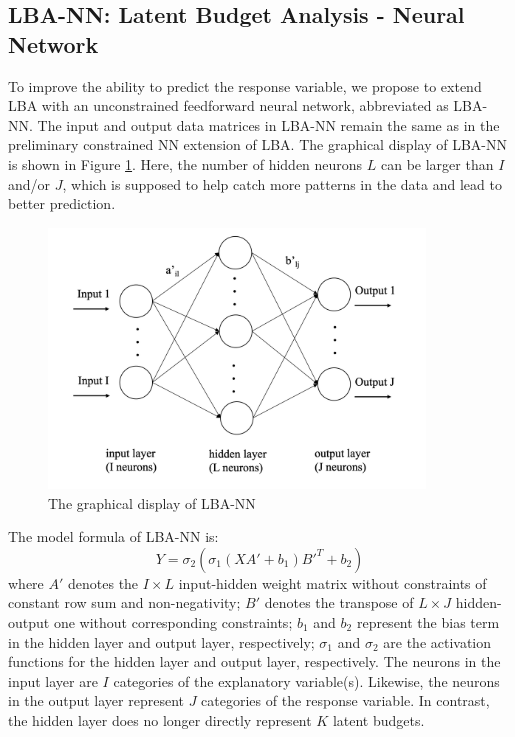 \documentclass[]{interact}
\theoremstyle{plain}%
\theoremstyle{definition}
\theoremstyle{remark}
\begin{document}
\hypertarget{subsection:lbann}{%
\subsection{LBA-NN: Latent Budget Analysis - Neural
Network}\label{subsection:lbann}}

To improve the ability to predict the response variable, we propose to
extend LBA with an unconstrained feedforward neural network, abbreviated
as LBA-NN. The input and output data matrices in LBA-NN remain the same
as in the preliminary constrained NN extension of LBA. The graphical
display of LBA-NN is shown in Figure \ref{fig:2}. Here, the number of
hidden neurons \(L\) can be larger than \(I\) and/or \(J\), which is
supposed to help catch more patterns in the data and lead to better
prediction.

\begin{figure}[H]

{\centering \includegraphics[width=10cm]{figure/2_unconstrained NN} 

}

\caption{The graphical display of LBA-NN}\label{fig:2}
\end{figure}
\par

The model formula of LBA-NN is: \begin{equation}
Y = \sigma_2( \sigma_1 (XA' + b_1)B'^T + b_2) \tag{3.1}
\end{equation} where \(A'\) denotes the \(I \times L\) input-hidden
weight matrix without constraints of constant row sum and
non-negativity; \(B'\) denotes the transpose of \(L \times J\)
hidden-output one without corresponding constraints; \(b_1\) and \(b_2\)
represent the bias term in the hidden layer and output layer,
respectively; \(\sigma_1\) and \(\sigma_2\) are the activation functions
for the hidden layer and output layer, respectively. The neurons in the
input layer are \(I\) categories of the explanatory variable(s).
Likewise, the neurons in the output layer represent \(J\) categories of
the response variable. In contrast, the hidden layer does no longer
directly represent \(K\) latent budgets.
\end{document}
